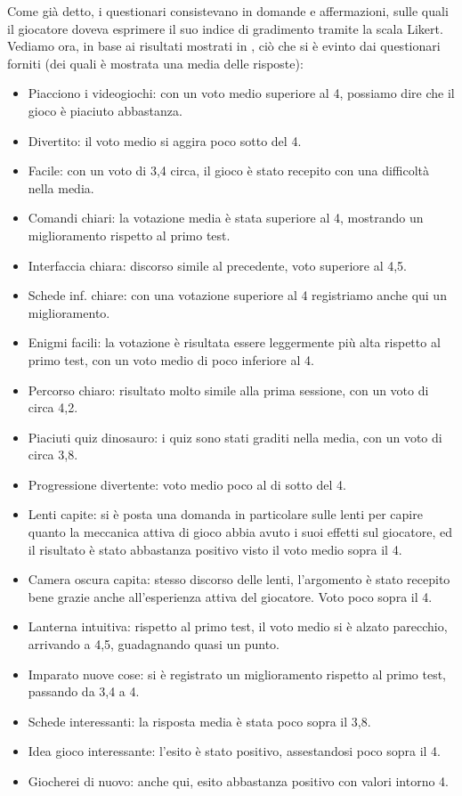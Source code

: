 Come già detto, i questionari consistevano in domande e affermazioni, sulle quali il giocatore doveva esprimere il suo indice di gradimento tramite la scala Likert.
Vediamo ora, in base ai risultati mostrati in \myfig{\ref{fig:test-questionario02}}, ciò che si è evinto dai questionari forniti (dei quali è mostrata una media delle risposte):

\begin{itemize}

\item Piacciono i videogiochi: con un voto medio superiore al 4, possiamo dire che il gioco è piaciuto abbastanza.
\item Divertito: il voto medio si aggira poco sotto del 4.
\item Facile: con un voto di 3,4 circa, il gioco è stato recepito con una difficoltà nella media.
\item Comandi chiari: la votazione media è stata superiore al 4, mostrando un miglioramento rispetto al primo test.
\item Interfaccia chiara: discorso simile al precedente, voto superiore al 4,5.
\item Schede inf. chiare: con una votazione superiore al 4 registriamo anche qui un miglioramento.
\item Enigmi facili: la votazione è risultata essere leggermente più alta rispetto al primo test, con un voto medio di poco inferiore al 4.
\item Percorso chiaro:  risultato molto simile alla prima sessione, con un voto di circa 4,2.
\item Piaciuti quiz dinosauro: i quiz sono stati graditi nella media, con un voto di circa 3,8.
\item Progressione divertente: voto medio poco al di sotto del 4.
\item Lenti capite: si è posta una domanda in particolare sulle lenti per capire quanto la meccanica attiva di gioco abbia avuto i suoi effetti sul giocatore, ed il risultato è stato abbastanza positivo visto il voto medio sopra il 4.
\item Camera oscura capita: stesso discorso delle lenti, l'argomento è stato recepito bene grazie anche all'esperienza attiva del giocatore. Voto poco sopra il 4.
\item Lanterna intuitiva: rispetto al primo test, il voto medio si è alzato parecchio, arrivando a 4,5, guadagnando quasi un punto.
\item Imparato nuove cose: si è registrato un miglioramento rispetto al primo test, passando da 3,4 a 4.
\item Schede interessanti: la risposta media è stata poco sopra il 3,8.
\item Idea gioco interessante: l'esito è stato positivo, assestandosi poco sopra il 4.
\item Giocherei di nuovo: anche qui, esito abbastanza positivo con valori intorno 4.

\end{itemize}

